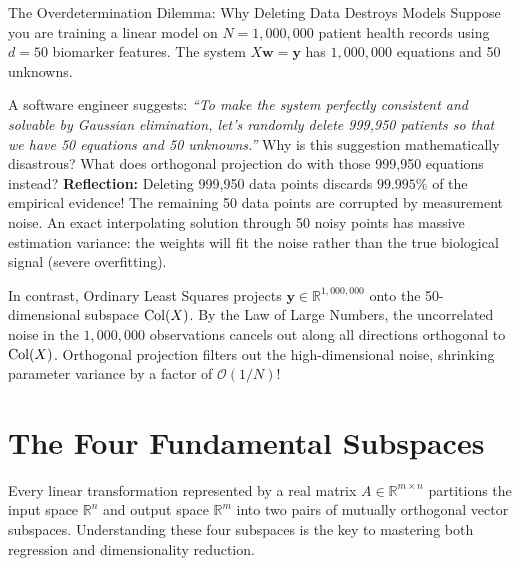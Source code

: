 \begin{ponderbox}{The Overdetermination Dilemma: Why Deleting Data Destroys Models}
Suppose you are training a linear model on $N = 1{,}000{,}000$ patient health records using $d = 50$ biomarker features. The system $X\mathbf{w} = \mathbf{y}$ has $1{,}000{,}000$ equations and 50 unknowns. 

A software engineer suggests: \textit{``To make the system perfectly consistent and solvable by Gaussian elimination, let's randomly delete 999,950 patients so that we have 50 equations and 50 unknowns.''}
Why is this suggestion mathematically disastrous? What does orthogonal projection do with those 999,950 equations instead?
\tcblower
\textbf{Reflection:} Deleting 999,950 data points discards $99.995\%$ of the empirical evidence! The remaining 50 data points are corrupted by measurement noise. An exact interpolating solution through 50 noisy points has massive estimation variance: the weights will fit the noise rather than the true biological signal (severe overfitting).

In contrast, Ordinary Least Squares projects $\mathbf{y} \in \mathbb{R}^{1{,}000{,}000}$ onto the 50-dimensional subspace $\operatorname{Col}(X)$. By the Law of Large Numbers, the uncorrelated noise in the $1{,}000{,}000$ observations cancels out along all directions orthogonal to $\operatorname{Col}(X)$. Orthogonal projection filters out the high-dimensional noise, shrinking parameter variance by a factor of $\mathcal{O}(1/N)$!
\end{ponderbox}

\section{The Four Fundamental Subspaces}

Every linear transformation represented by a real matrix $A \in \mathbb{R}^{m \times n}$ partitions the input space $\mathbb{R}^n$ and output space $\mathbb{R}^m$ into two pairs of mutually orthogonal vector subspaces. Understanding these four subspaces is the key to mastering both regression and dimensionality reduction.

